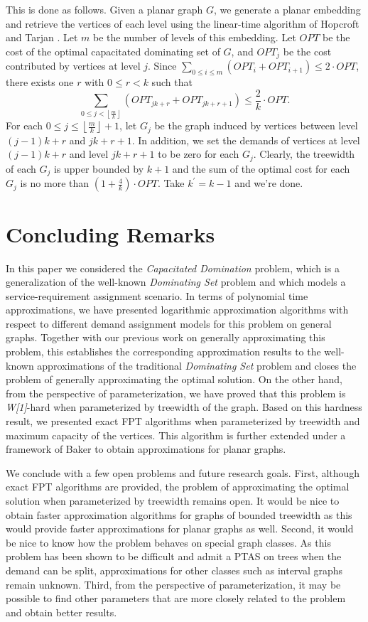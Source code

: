 \documentclass[a4paper,11pt]{article}
\theoremstyle{definition}
\begin{document}
This is done as follows. Given a planar graph $G$, we generate a planar embedding and retrieve the vertices of each level using the linear-time algorithm of Hopcroft and Tarjan \cite{321852}. Let $m$ be the number of levels of this embedding. Let $OPT$ be the cost of the optimal capacitated dominating set of $G$, and $OPT_j$ be the cost contributed by vertices at level $j$. Since $\sum_{0\le i\le m}(OPT_i+OPT_{i+1})\le 2\cdot OPT$, there exists one $r$ with $0\le r<k$ such that 
$$\sum_{0\le j<\left\lfloor \frac{m}{k}\right\rfloor}\left(OPT_{jk+r}+OPT_{jk+r+1}\right)\le \frac{2}{k}\cdot OPT.$$
For each $0\le j \le \left\lfloor \frac{m}{k}\right\rfloor +1$, let $G_j$ be the graph induced by vertices between level $(j-1)k+r$ and $jk+r+1$. In addition, we set the demands of vertices at level $(j-1)k+r$ and level $jk+r+1$ to be zero for each $G_j$. Clearly, the treewidth of each $G_j$ is upper bounded by $k+1$ and the sum of the optimal cost for each $G_j$ is no more than $(1+\frac{4}{k})\cdot OPT$. Take $k^\prime = k-1$ and we're done.



\section{Concluding Remarks} \label{conclusion}

In this paper we considered the {\em Capacitated Domination} problem, which is a generalization of the well-known {\em Dominating Set} problem and which models a service-requirement assignment scenario. In terms of polynomial time approximations, we have presented logarithmic approximation algorithms with respect to different demand assignment models for this problem on general graphs. Together with our previous
work on generally approximating this problem, this establishes the corresponding approximation results to the well-known approximations of the traditional {\em Dominating Set} problem and closes the problem of generally approximating the optimal solution. On the other hand, from the perspective of parameterization, we have proved that this problem is {\it W[1]}-hard when parameterized by treewidth of the graph. Based on this hardness result, we presented exact FPT algorithms when parameterized by treewidth and maximum capacity of the vertices. This algorithm is further extended under a framework of Baker \cite{174650} to obtain approximations for planar graphs.

We conclude with a few open problems and future research goals. First, although exact FPT algorithms are provided, the problem of approximating the optimal solution when parameterized by treewidth remains open. It would be nice to obtain faster approximation algorithms for graphs of bounded treewidth as this would provide faster approximations for planar graphs as well. Second, it would be nice to know how the problem behaves on special graph classes. As this problem has been shown to be difficult and admit a PTAS on trees when the demand can be split, approximations for other classes such as interval graphs remain unknown. Third, from the perspective of parameterization, it may be possible to find other parameters that are more closely related to the problem and obtain better results.





\small

\end{document}
